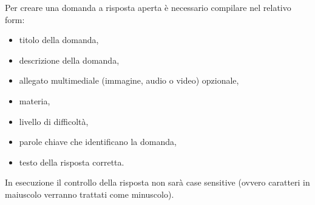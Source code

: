 \documentclass[a4paper, titlepage]{article}
\begin{document}
	 Per creare una domanda a risposta aperta è necessario compilare nel relativo form:
	 \begin{itemize}
	 	\item titolo della domanda,
	 	\item descrizione della domanda,
	 	\item allegato multimediale (immagine, audio o video) opzionale,
	 	\item materia,
	 	\item livello di difficoltà,
	 	\item parole chiave che identificano la domanda,
	 	\item testo della risposta corretta.
	 \end{itemize}
	 In esecuzione il controllo della risposta non sarà case sensitive (ovvero caratteri in maiuscolo verranno trattati come minuscolo).
	 
	 \newpage
\end{document}
